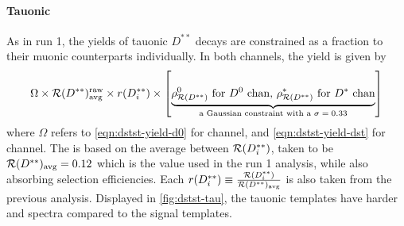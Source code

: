 \paragraph{Tauonic}
As in run 1, the yields of  tauonic $D^{**}$ decays are constrained as a
fraction to their muonic counterparts individually.
In both channels, the yield is given by
\begin{equation}
    \Omega \times \fitRDststRaw \times \fitRDiRatio \times \left[
        \underbrace{\text{\fitRDDstst for \Dz chan, \fitRDstst for \Dstar chan}}_\text{
            a Gaussian constraint with a $\sigma = 0.33$
        }
    \right]
\end{equation}
where $\Omega$ refers to \cref{eqn:dstst-yield-d0} for \Dz channel,
and \cref{eqn:dstst-yield-dst} for \Dstar channel.
The \fitRDststRaw is based on the average between $\mathcal{R}(D^{**}_i)$,
taken to be $\mathcal{R}(D^{**})_\text{avg} = 0.12$ which is the value used in
the run 1 analysis,
while also absorbing selection efficiencies.
Each
$r(D^{**}_i) \equiv \frac{\mathcal{R}(D^{**}_i)}{\mathcal{R}(D^{**})_\text{avg}}$
is also taken from the previous analysis.
Displayed in \ref{fig:dstst-tau},
the tauonic \Dstst templates have harder \mmSq and \qSq spectra compared to the
signal templates.

